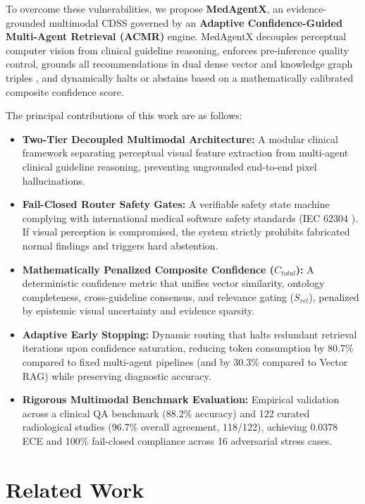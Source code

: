 \documentclass[journal,10pt,twocolumn]{IEEEtran}
\begin{document}
To overcome these vulnerabilities, we propose \textbf{MedAgentX}, an evidence-grounded multimodal CDSS governed by an \textbf{Adaptive Confidence-Guided Multi-Agent Retrieval (ACMR)} engine. MedAgentX decouples perceptual computer vision from clinical guideline reasoning, enforces pre-inference quality control, grounds all recommendations in dual dense vector and knowledge graph triples \cite{pan2024unifying}, and dynamically halts or abstains based on a mathematically calibrated composite confidence score.

The principal contributions of this work are as follows:
\begin{itemize}
    \item \textbf{Two-Tier Decoupled Multimodal Architecture:} A modular clinical framework separating perceptual visual feature extraction from multi-agent clinical guideline reasoning, preventing ungrounded end-to-end pixel hallucinations.
    \item \textbf{Fail-Closed Router Safety Gates:} A verifiable safety state machine complying with international medical software safety standards (IEC 62304 \cite{iec62304}). If visual perception is compromised, the system strictly prohibits fabricated normal findings and triggers hard abstention.
    \item \textbf{Mathematically Penalized Composite Confidence ($C_{total}$):} A deterministic confidence metric that unifies vector similarity, ontology completeness, cross-guideline consensus, and relevance gating ($S_{rel}$), penalized by epistemic visual uncertainty \cite{lakshminarayanan2017simple,gal2016dropout,kompa2021second} and evidence sparsity.
    \item \textbf{Adaptive Early Stopping:} Dynamic routing that halts redundant retrieval iterations upon confidence saturation, reducing token consumption by 80.7\% compared to fixed multi-agent pipelines (and by 30.3\% compared to Vector RAG) while preserving diagnostic accuracy.
    \item \textbf{Rigorous Multimodal Benchmark Evaluation:} Empirical validation across a clinical QA benchmark (88.2\% accuracy) and 122 curated radiological studies (96.7\% overall agreement, 118/122), achieving 0.0378 ECE and 100\% fail-closed compliance across 16 adversarial stress cases.
\end{itemize}

\section{Related Work}
\end{document}
